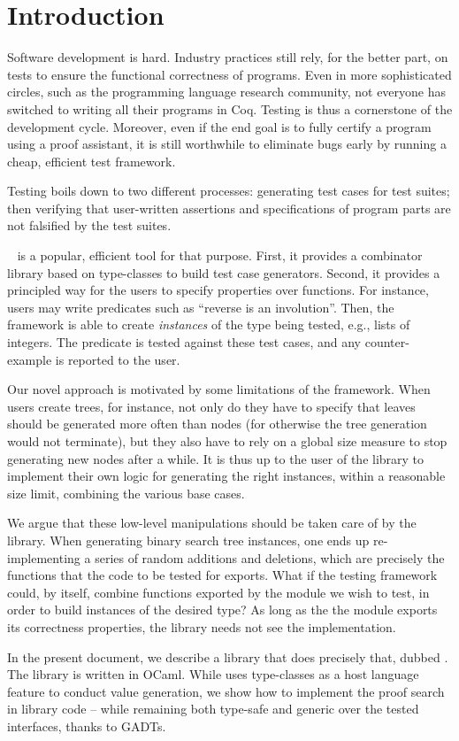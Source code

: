 \section{Introduction}
\label{sec:introduction}

Software development is hard. Industry practices still rely, for the better
part, on tests to ensure the functional correctness of programs. Even in more
sophisticated circles, such as the programming language research community, not
everyone has switched to writing all their programs in Coq. Testing is thus a
cornerstone of the development cycle. Moreover, even if the end goal is to fully
certify a program using a proof assistant, it is still worthwhile to eliminate
bugs early by running a cheap, efficient test framework.

Testing boils down to two different processes: generating test cases
for test suites; then verifying that user-written assertions and
specifications of program parts are not falsified by the test suites.

\qcheck{}~\cite{DBLP:conf/icfp/ClaessenH00} is a popular, efficient
tool for that purpose. First, it provides a combinator library based
on type-classes to build test case generators. Second, it provides
a principled way for the users to specify properties over
functions. For instance, users may write predicates such as ``reverse
is an involution''. Then, the \qcheck framework is able to create
\emph{instances} of the type being tested, e.g., lists of integers.
The predicate is tested against these test cases, and any
counter-example is reported to the user.

Our novel approach is motivated by some limitations of the \qcheck
framework.  When users create trees, for instance, not only do they
have to specify that leaves should be generated more often than nodes
(for otherwise the tree generation would not terminate), but they also
have to rely on a global size measure to stop generating new nodes
after a while. It is thus up to the user of the library to implement
their own logic for generating the right instances, within a
reasonable size limit, combining the various base cases.

We argue that these low-level manipulations should be taken care of by the
library. When generating binary search tree instances, one ends up
re-implementing a series of random additions and deletions, which are precisely
the functions that the code to be tested for exports. What if the testing
framework could, by itself, combine functions exported by the module we wish to
test, in order to build instances of the desired type? As long as the the module
exports its correctness properties, the library needs not see the implementation.

In the present document, we describe a library that does precisely
that, dubbed \arti. The library is written in OCaml. While \qcheck
uses type-classes as a host language feature to conduct value
generation, we show how to implement the proof search in library
code -- while remaining both type-safe and generic over the
tested interfaces, thanks to GADTs.
